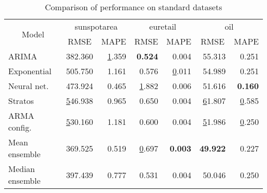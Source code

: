 \begin{table}[]
\centering
\caption{Comparison of performance on standard datasets}
\begin{tabular}{|l|l|r|r|r|r|r|}
\hline
\multicolumn{1}{|c|}{\multirow{2}{*}{Model}} & \multicolumn{2}{c|}{sunspotarea}                                  & \multicolumn{2}{c|}{euretail}                                        & \multicolumn{2}{c|}{oil}                                              \\ \cline{2-7} 
\multicolumn{1}{|c|}{}                       & \multicolumn{1}{c|}{RMSE} & \multicolumn{1}{c|}{MAPE}             & \multicolumn{1}{c|}{RMSE}    & \multicolumn{1}{c|}{MAPE}             & \multicolumn{1}{c|}{RMSE}              & \multicolumn{1}{c|}{MAPE}    \\ \hline
ARIMA                                        & 382.360                 & {\ul 1.359}                         & \textbf{0.524}             & 0.004                               & 55.313                               & 0.251                      \\ \hline
Exponential                                  & 505.750                 & 1.161                               & 0.576                      & {\ul 0.011}                         & 54.989                               & 0.251                      \\ \hline
Neural net.                                  & 473.924                 & 0.465                               & {\ul 1.882}                & 0.006                               & 51.616                               & \textbf{0.160}             \\ \hline
Stratos                                      & {\ul 546.938}           & 0.965                               & 0.650                      & 0.004                               & {\ul 61.807}                         & {\ul 0.585}                \\ \hline
ARMA config.                                      & {\ul 530.160}           & 1.181                               & 0.600                      & 0.004                           & {\ul 51.986}                         & {\ul 0.250}                \\ \hline

Mean ensemble                                  & 369.525                 & 0.519                               & {\ul 0.697}                & \textbf{0.003}                               & \textbf{49.922}                              & 0.227             \\ \hline
Median ensemble                                  & 397.439                 & 0.777                               & 0.531                & 0.004                               & 50.046                              &  0.250             \\ \hline


\end{tabular}
\end{table}
